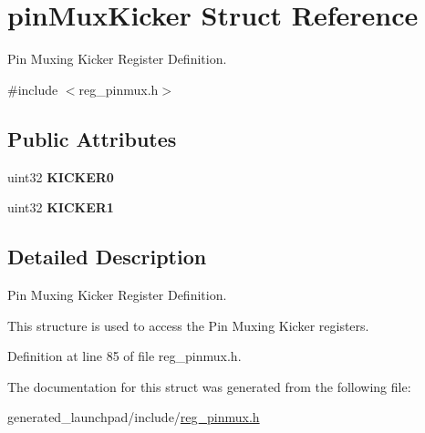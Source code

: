 \hypertarget{structpinMuxKicker}{}\section{pin\+Mux\+Kicker Struct Reference}
\label{structpinMuxKicker}


Pin Muxing Kicker Register Definition.  




{\ttfamily \#include $<$reg\+\_\+pinmux.\+h$>$}

\subsection*{Public Attributes}
\begin{DoxyCompactItemize}
\item 
\mbox{\label{structpinMuxKicker_aff20c207f8440c3f88332cf10f9fbc46}} 
uint32 {\bfseries K\+I\+C\+K\+E\+R0}
\item 
\mbox{\label{structpinMuxKicker_a6203ea35a9b68cdb3056e1cfd19840d4}} 
uint32 {\bfseries K\+I\+C\+K\+E\+R1}
\end{DoxyCompactItemize}


\subsection{Detailed Description}
Pin Muxing Kicker Register Definition. 

This structure is used to access the Pin Muxing Kicker registers. 

Definition at line 85 of file reg\+\_\+pinmux.\+h.



The documentation for this struct was generated from the following file\+:\begin{DoxyCompactItemize}
\item 
generated\+\_\+launchpad/include/\mbox{\hyperlink{reg__pinmux_8h}{reg\+\_\+pinmux.\+h}}\end{DoxyCompactItemize}
